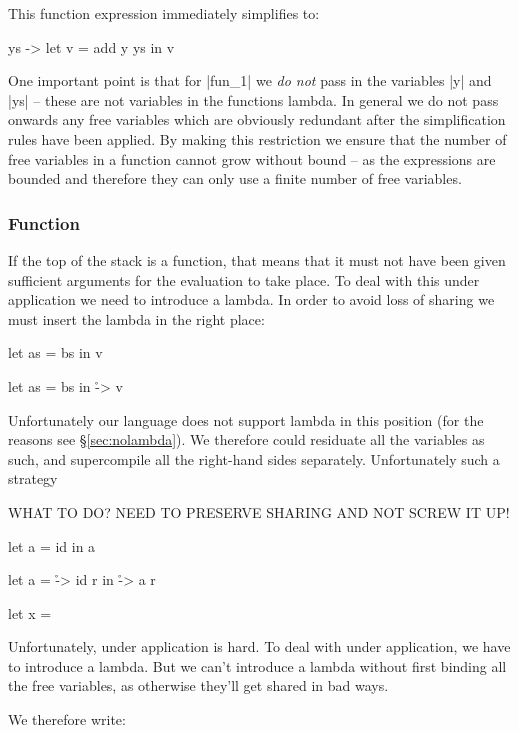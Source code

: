\documentclass{sigplanconf}
\begin{document}
This function expression immediately simplifies to:

\begin{code}
\y ys ->  let  v = add y ys
          in v
\end{code}

One important point is that for |fun_1| we \textit{do not} pass in the variables |y| and |ys| -- these are not variables in the functions lambda. In general we do not pass onwards any free variables which are obviously redundant after the simplification rules have been applied. By making this restriction we ensure that the number of free variables in a function cannot grow without bound -- as the expressions are bounded and therefore they can only use a finite number of free variables.

\subsubsection{Function}

If the top of the stack is a function, that means that it must not have been given sufficient arguments for the evaluation to take place. To deal with this under application we need to introduce a lambda. In order to avoid loss of sharing we must insert the lambda in the right place:

\begin{code}
let as = bs
in  v
\end{code}

\begin{code}
let as = bs
in \r -> v
\end{code}

Unfortunately our language does not support lambda in this position (for the reasons see \S\ref{sec:nolambda}). We therefore could residuate all the variables as such, and supercompile all the right-hand sides separately. Unfortunately such a strategy 

WHAT TO DO? NEED TO PRESERVE SHARING AND NOT SCREW IT UP!

let a = id
in a

let a = \r -> id r
in \r -> a r

let x = 




Unfortunately, under application is hard. To deal with under application, we have to introduce a lambda. But we can't introduce a lambda without first binding all the free variables, as otherwise they'll get shared in bad ways.

We therefore write:
\end{document}
